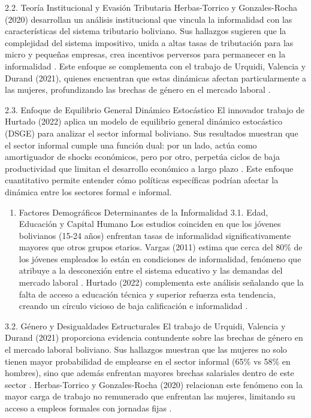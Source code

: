 \documentclass[Royal,times,sageh]{sagej}
\providecommand{\tightlist}{%
  \setlength{\itemsep}{0pt}\setlength{\parskip}{0pt}}
\begin{document}
2.2. Teoría Institucional y Evasión Tributaria Herbas-Torrico y
Gonzales-Rocha (2020) desarrollan un análisis institucional que vincula
la informalidad con las características del sistema tributario
boliviano. Sus hallazgos sugieren que la complejidad del sistema
impositivo, unida a altas tasas de tributación para las micro y pequeñas
empresas, crea incentivos perversos para permanecer en la informalidad
\citep{herbas2020analisis}. Este enfoque se complementa con el trabajo
de Urquidi, Valencia y Durand (2021), quienes encuentran que estas
dinámicas afectan particularmente a las mujeres, profundizando las
brechas de género en el mercado laboral \citep{urquidi2021brecha}.

2.3. Enfoque de Equilibrio General Dinámico Estocástico El innovador
trabajo de Hurtado (2022) aplica un modelo de equilibrio general
dinámico estocástico (DSGE) para analizar el sector informal boliviano.
Sus resultados muestran que el sector informal cumple una función dual:
por un lado, actúa como amortiguador de shocks económicos, pero por
otro, perpetúa ciclos de baja productividad que limitan el desarrollo
económico a largo plazo \citep{hurtado2022rol}. Este enfoque
cuantitativo permite entender cómo políticas específicas podrían afectar
la dinámica entre los sectores formal e informal.

\begin{enumerate}
\def\labelenumi{\arabic{enumi}.}
\setcounter{enumi}{2}
\tightlist
\item
  Factores Demográficos Determinantes de la Informalidad 3.1. Edad,
  Educación y Capital Humano Los estudios coinciden en que los jóvenes
  bolivianos (15-24 años) enfrentan tasas de informalidad
  significativamente mayores que otros grupos etarios. Vargas (2011)
  estima que cerca del 80\% de los jóvenes empleados lo están en
  condiciones de informalidad, fenómeno que atribuye a la desconexión
  entre el sistema educativo y las demandas del mercado laboral
  \citep{vargas2011ser}. Hurtado (2022) complementa este análisis
  señalando que la falta de acceso a educación técnica y superior
  refuerza esta tendencia, creando un círculo vicioso de baja
  calificación e informalidad \citep{hurtado2022rol}.
\end{enumerate}

3.2. Género y Desigualdades Estructurales El trabajo de Urquidi,
Valencia y Durand (2021) proporciona evidencia contundente sobre las
brechas de género en el mercado laboral boliviano. Sus hallazgos
muestran que las mujeres no solo tienen mayor probabilidad de emplearse
en el sector informal (65\% vs 58\% en hombres), sino que además
enfrentan mayores brechas salariales dentro de este sector
\citep{urquidi2021brecha}. Herbas-Torrico y Gonzales-Rocha (2020)
relacionan este fenómeno con la mayor carga de trabajo no remunerado que
enfrentan las mujeres, limitando su acceso a empleos formales con
jornadas fijas \citep{herbas2020analisis}.
\end{document}
